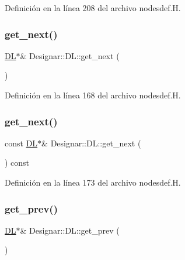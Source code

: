 Definición en la línea 208 del archivo nodesdef.\+H.

\mbox{\label{class_designar_1_1_d_l_a9ba5385743ae2c266ea51dcb05f79803}} 
\subsubsection{\texorpdfstring{get\+\_\+next()}{get\_next()}\hspace{0.1cm}{\footnotesize\ttfamily [1/2]}}
{\footnotesize\ttfamily \hyperlink{class_designar_1_1_d_l}{DL}$\ast$\& Designar\+::\+D\+L\+::get\+\_\+next (\begin{DoxyParamCaption}{ }\end{DoxyParamCaption})\hspace{0.3cm}{\ttfamily [inline]}}



Definición en la línea 168 del archivo nodesdef.\+H.

\mbox{\label{class_designar_1_1_d_l_ad95ed8f7db042ad4f537b335e8b77772}} 
\subsubsection{\texorpdfstring{get\+\_\+next()}{get\_next()}\hspace{0.1cm}{\footnotesize\ttfamily [2/2]}}
{\footnotesize\ttfamily const \hyperlink{class_designar_1_1_d_l}{DL}$\ast$\& Designar\+::\+D\+L\+::get\+\_\+next (\begin{DoxyParamCaption}{ }\end{DoxyParamCaption}) const\hspace{0.3cm}{\ttfamily [inline]}}



Definición en la línea 173 del archivo nodesdef.\+H.

\mbox{\label{class_designar_1_1_d_l_a479355d41d2d7085b33342a14c0ca514}} 
\subsubsection{\texorpdfstring{get\+\_\+prev()}{get\_prev()}\hspace{0.1cm}{\footnotesize\ttfamily [1/2]}}
{\footnotesize\ttfamily \hyperlink{class_designar_1_1_d_l}{DL}$\ast$\& Designar\+::\+D\+L\+::get\+\_\+prev (\begin{DoxyParamCaption}{ }\end{DoxyParamCaption})\hspace{0.3cm}{\ttfamily [inline]}}



